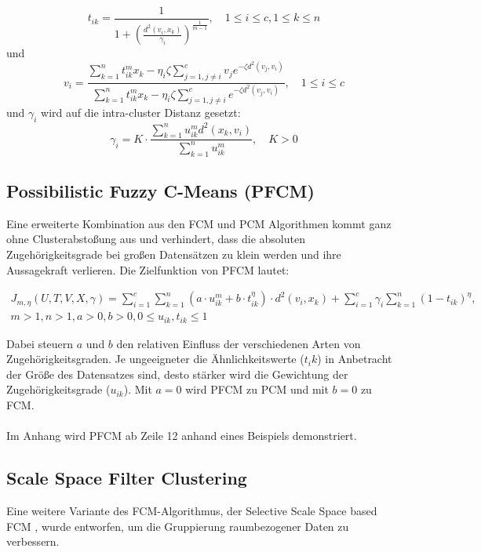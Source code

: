 \documentclass[11pt,ceqn]{book}
\begin{document}
$$t_{ik} = \frac{1}{1+\left(\frac{d^2(v_i,x_k)}{\gamma_i}\right)^{\frac{1}{m-1}}},\quad 1\leqslant i \leqslant c, 1\leqslant k\leqslant n$$
und
$$v_i = \frac{\sum\limits_{k=1}^n t_{ik}^m x_k - \eta_i \zeta \sum\limits_{j=1,j\neq i}^c v_j e^{-\zeta d^2(v_j,v_i)}}{\sum\limits_{k=1}^n t_{ik}^m x_k - \eta_i \zeta \sum\limits_{j=1,j\neq i}^c e^{-\zeta d^2(v_j,v_i)}},\quad 1\leqslant i \leqslant c$$
und $\gamma_i$ wird auf die intra-cluster Distanz gesetzt:
$$\gamma_i = K\cdot \frac{\sum\limits_{k=1}^n u_{ik}^m d^2 (x_k, v_i)}{\sum\limits_{k=1}^n u_{ik}^m},\quad K>0$$

\subsection{Possibilistic Fuzzy C-Means (PFCM)}
Eine erweiterte Kombination aus den FCM und PCM Algorithmen kommt ganz ohne Clusterabstoßung aus und verhindert, dass die absoluten Zugehörigkeitsgrade bei großen Datensätzen zu klein werden und ihre Aussagekraft verlieren. Die Zielfunktion von PFCM \cite{pfcmpaper} lautet:

\begin{equation}
\begin{split}
J_{m,\eta}(U,T,V,X,\gamma) = \sum_{i=1}^{c} \sum_{k=1}^{n} \left(a\cdot u_{ik}^m + b\cdot t_{ik}^{\eta}\right)\cdot d^2(v_i,x_k) + \sum_{i=1}^c  \gamma_i \sum_{k=1}^n (1-t_{ik})^{\eta}, \\ m>1, n>1,a>0, b>0, 0\leqslant u_{ik}, t_{ik} \leqslant 1
\end{split}
\end{equation}

Dabei steuern $a$ und $b$ den relativen Einfluss der verschiedenen Arten von Zugehörigkeitsgraden. Je ungeeigneter die Ähnlichkeitswerte ($t_ik$) in Anbetracht der Größe des Datensatzes sind, desto stärker wird die Gewichtung der Zugehörigkeitsgrade ($u_{ik}$). Mit $a=0$ wird PFCM zu PCM und mit $b=0$ zu FCM.
\\~\\
Im Anhang wird PFCM ab Zeile 12 anhand eines Beispiels demonstriert.

\subsection{Scale Space Filter Clustering}
Eine weitere Variante des FCM-Algorithmus, der Selective Scale Space based FCM \cite{scalespacefcm}, wurde entworfen, um die Gruppierung raumbezogener Daten zu verbessern. \\
\end{document}
